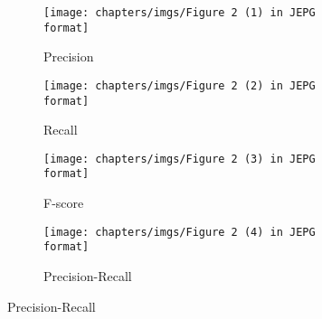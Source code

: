 \begin{figure}[!htbp]
	\centering
	
	\captionsetup{size=footnotesize}
	\begin{subfigure}{0.45\textwidth}
		\centering
		\captionsetup{skip=1pt}
		\captionsetup{size=scriptsize}
		\texttt{[image: chapters/imgs/Figure 2 (1) in JEPG format]}
		\caption{Precision}
		\label{RQ2.1.sub1}
	\end{subfigure}
	\begin{subfigure}{0.45\textwidth}
		\centering
		\captionsetup{skip=4pt}
		\captionsetup{size=scriptsize}
		\texttt{[image: chapters/imgs/Figure 2 (2) in JEPG format]}
		\caption{Recall}
		\label{RQ2.1.sub2}
	\end{subfigure}
	
	
	\begin{subfigure}{0.45\textwidth}
		\centering
		\captionsetup{skip=4pt}
		\captionsetup{size=scriptsize}
		\texttt{[image: chapters/imgs/Figure 2 (3) in JEPG format]}
		\caption{F-score}
		\label{RQ2.1.sub3}
	\end{subfigure}
	\begin{subfigure}{0.45\textwidth}
		\centering
		\captionsetup{skip=4pt}
		\captionsetup{size=scriptsize}
		\texttt{[image: chapters/imgs/Figure 2 (4) in JEPG format]}
		\caption{Precision-Recall}
		\label{RQ2.1.sub4}
	\end{subfigure}
	
    \label{RQ2.1}
\end{figure}


